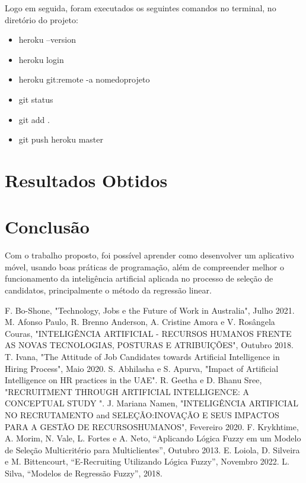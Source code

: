 \documentclass[conference]{IEEEtran}
\begin{document}
Logo em seguida, foram executados os seguintes comandos no terminal, no diretório do projeto:

\begin{itemize}
\item heroku –version
\item heroku login
\item heroku git:remote -a nomedoprojeto
\item git status
\item git add .
\item git push heroku master
\end{itemize}

\section*{Resultados Obtidos}



\section*{Conclusão}
Com o trabalho proposto, foi possível aprender como desenvolver um aplicativo móvel, usando boas práticas de programação, além de compreender melhor o funcionamento da inteligência artificial aplicada no processo de seleção de candidatos, principalmente o método da regressão linear.

\begin{thebibliography}{00}
 F. Bo-Shone, "Technology, Jobs e the Future of Work in Australia", Julho 2021.
 M. Afonso Paulo, R. Brenno Anderson, A. Cristine Amora e V. Rosângela Couras, "INTELIGÊNCIA ARTIFICIAL - RECURSOS HUMANOS FRENTE AS NOVAS TECNOLOGIAS, POSTURAS E ATRIBUIÇÕES", Outubro 2018.
 T. Ivana, "The Attitude of Job Candidates towards Artificial Intelligence in Hiring Process", Maio 2020.
 S. Abhilasha e S. Apurva, "Impact of Artificial Intelligence on HR practices in the UAE".
 R. Geetha e D. Bhanu Sree, "RECRUITMENT THROUGH ARTIFICIAL INTELLIGENCE: A CONCEPTUAL STUDY ".
 J. Mariana Namen, "INTELIGÊNCIA ARTIFICIAL NO RECRUTAMENTO and SELEÇÃO:INOVAÇÃO E SEUS IMPACTOS PARA A GESTÃO DE RECURSOSHUMANOS", Fevereiro 2020.
 F. Krykhtime, A. Morim, N. Vale, L. Fortes e A. Neto, “Aplicando Lógica Fuzzy em um Modelo de Seleção Multicritério para Multiclientes”, Outubro 2013.
 E. Loiola, D. Silveira e M. Bittencourt, “E-Recruiting Utilizando Lógica Fuzzy”, Novembro 2022.
 L. Silva, “Modelos de Regressão Fuzzy”, 2018.
\end{thebibliography}
\vspace{12pt}
\end{document}
